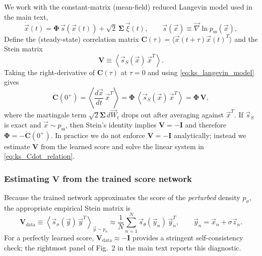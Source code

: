 \documentclass[%
  prl,
  reprint,
  amsmath,
  amssymb,
  aps
]{revtex4-2}
\newcommand{\vvec}[1]{\vec{#1}}
\begin{document}
We work with the constant-matrix (mean-field) reduced Langevin model used in the main text,
\begin{equation}
\dot{\vvec{x}}(t)
=
\bm{\Phi}\,\vvec{s}(\vvec{x}(t))
+\sqrt{2}\,\bm{\Sigma}\,\vvec{\xi}(t),
\qquad
\vvec{s}(\vvec{x})\equiv \vvec{\nabla}\ln p_{\mathrm{ss}}(\vvec{x}),
\label{eq:ks_langevin_model}
\end{equation}
Define the (steady-state) correlation matrix $\bm{C}(\tau)=\langle \vvec{x}(t+\tau)\vvec{x}(t)^T\rangle$ and the Stein matrix
\begin{equation}
\bm{V}\equiv \left\langle \vvec{s}_S(\vvec{x})\,\vvec{x}^T\right\rangle.
\label{eq:ks_stein_matrix_def}
\end{equation}
Taking the right-derivative of $\bm{C}(\tau)$ at $\tau=0$ and using \eqref{eq:ks_langevin_model} gives
\begin{equation}
\dot{\bm{C}}(0^+)
=
\left\langle \frac{d\vvec{x}}{dt}\,\vvec{x}^T\right\rangle
=
\bm{\Phi}\,\left\langle \vvec{s}_S(\vvec{x})\,\vvec{x}^T\right\rangle
=
\bm{\Phi}\,\bm{V},
\label{eq:ks_Cdot_relation}
\end{equation}
where the martingale term $\sqrt{2}\bm{\Sigma}\,d\vvec{W}_t$ drops out after averaging against $\vvec{x}^T$. If $\vvec{s}_S$ is exact and $\vvec{x}\sim p_{\mathrm{ss}}$, then Stein's identity implies $\bm{V}=-\bm{I}$ and therefore $\bm{\Phi}=-\dot{\bm{C}}(0^+)$. In practice we do not enforce $\bm{V}=-\bm{I}$ analytically; instead we estimate $\bm{V}$ from the learned score and solve the linear system in \eqref{eq:ks_Cdot_relation}.

\subsubsection{Estimating \texorpdfstring{$\bm{V}$}{V} from the trained score network}
\label{sec:ks_V_estimator}

Because the trained network approximates the score of the \emph{perturbed} density $p_{\sigma}$, the appropriate empirical Stein matrix is
\begin{equation}
\bm{V}_{\mathrm{data}}
\equiv
\left\langle \vvec{s}_{\sigma}(\vvec{y})\,\vvec{y}^T\right\rangle_{\vvec{y}\sim p_{\sigma}}
\approx
\frac{1}{N}\sum_{n=1}^{N}\vvec{s}_{\theta}(\vvec{y}_n)\,\vvec{y}_n^T,
\qquad
\vvec{y}_n=\vvec{x}_n+\sigma\vvec{z}_n.
\label{eq:ks_V_data}
\end{equation}
For a perfectly learned score, $\bm{V}_{\mathrm{data}}\approx -\bm{I}$ provides a stringent self-consistency check; the rightmost panel of Fig.~2 in the main text reports this diagnostic.
\end{document}
